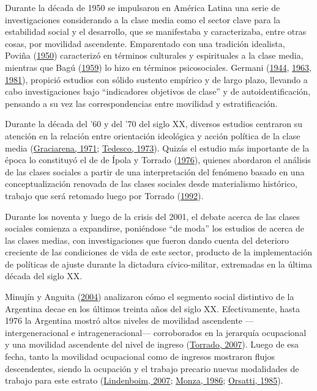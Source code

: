 \documentclass[
]{article}
\begin{document}
Durante la década de 1950 se impulsaron en América Latina una serie de investigaciones considerando a la clase media como el sector clave para la estabilidad social y el desarrollo, que se manifestaba y caracterizaba, entre otras cosas, por movilidad ascendente. Emparentado con una tradición idealista, Poviña (\protect\hyperlink{ref-Povina1950}{1950}) caracterizó en términos culturales y espirituales a la clase media, mientras que Bagú (\protect\hyperlink{ref-Bagu1959}{1959}) lo hizo en términos psicosociales. Germani (\protect\hyperlink{ref-Germani1944}{1944}, \protect\hyperlink{ref-Germani1963}{1963}, \protect\hyperlink{ref-Germani1981}{1981}), propició estudios con sólido sustento empírico y de largo plazo, llevando a cabo investigaciones bajo ``indicadores objetivos de clase'' y de autoidentificación, pensando a su vez las correspondencias entre movilidad y estratificación.

Durante la década del '60 y del '70 del siglo XX, diversos estudios centraron su atención en la relación entre orientación ideológica y acción política de la clase media (\protect\hyperlink{ref-Graciarena1971}{Graciarena, 1971}; \protect\hyperlink{ref-Tedesco1973}{Tedesco, 1973}). Quizás el estudio más importante de la época lo constituyó el de de Ípola y Torrado (\protect\hyperlink{ref-Ipola1976}{1976}), quienes abordaron el análisis de las clases sociales a partir de una interpretación del fenómeno basado en una conceptualización renovada de las clases sociales desde materialismo histórico, trabajo que será retomado luego por Torrado (\protect\hyperlink{ref-Torrado1992}{1992}).

Durante los noventa y luego de la crisis del 2001, el debate acerca de las clases sociales comienza a expandirse, poniéndose ``de moda'' los estudios de acerca de las clases medias, con investigaciones que fueron dando cuenta del deterioro creciente de las condiciones de vida de este sector, producto de la implementación de políticas de ajuste durante la dictadura cívico-militar, extremadas en la última década del siglo XX.

Minujín y Anguita (\protect\hyperlink{ref-Minujin2004}{2004}) analizaron cómo el segmento social distintivo de la Argentina decae en los últimos treinta años del siglo XX. Efectivamente, hasta 1976 la Argentina mostró altos niveles de movilidad ascendente ---intergeneracional e intrageneracional--- corroborados en la jerarquía ocupacional y una movilidad ascendente del nivel de ingreso (\protect\hyperlink{ref-Torrado2007}{Torrado, 2007}). Luego de esa fecha, tanto la movilidad ocupacional como de ingresos mostraron flujos descendentes, siendo la ocupación y el trabajo precario nuevas modalidades de trabajo para este estrato (\protect\hyperlink{ref-Lindenboim2007}{Lindenboim, 2007}; \protect\hyperlink{ref-Monza1986}{Monza, 1986}; \protect\hyperlink{ref-Orsatti1985}{Orsatti, 1985}).
\end{document}
